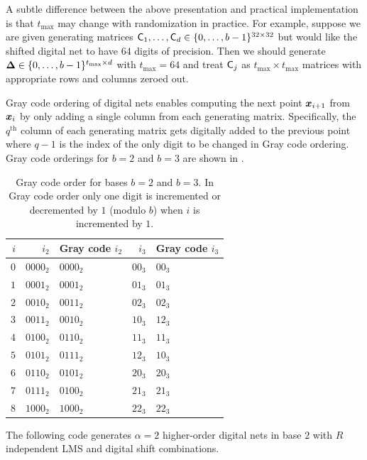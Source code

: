 \documentclass[acmsmall]{acmart}
\begin{document}
A subtle difference between the above presentation and practical implementation is that $t_\mathrm{max}$ may change with randomization in practice. For example, suppose we are given generating matrices ${\mathsf{C}}_1,\dots,{\mathsf{C}}_d \in \{0,\dots,b-1\}^{32 \times32}$ but would like the shifted digital net to have $64$ digits of precision. Then we should generate ${\boldsymbol{\Delta}} \in \{0,\dots,b-1\}^{t_\mathrm{max} \times d}$ with $t_\mathrm{max}=64$ and treat ${\mathsf{C}}_j$ as $t_\mathrm{max} \times t_\mathrm{max}$ matrices with appropriate rows and columns zeroed out. 

Gray code ordering of digital nets enables computing the next point ${\boldsymbol{x}}_{i+1}$ from ${\boldsymbol{x}}_i$ by only adding a single column from each generating matrix. Specifically, the $q^\mathrm{th}$ column of each generating matrix gets digitally added to the previous point where $q-1$ is the index of the only digit to be changed in Gray code ordering. Gray code orderings for $b=2$ and $b=3$ are shown in . 

\begin{table}[H]
    \centering
    \begin{tabular}{r | r l | r l }
        $i$ & $i_2$ & Gray code  $i_2$ & $i_3$ & Gray code $i_3$ \\
        \hline 
        $0$ & $0000_2$ & $0000_2$ & $00_3$ & $00_3$ \\
        $1$ & $0001_2$ & $0001_2$ & $01_3$ & $01_3$ \\ 
        $2$ & $0010_2$ & $0011_2$ & $02_3$ & $02_3$ \\ 
        $3$ & $0011_2$ & $0010_2$ & $10_3$ & $12_3$ \\ 
        $4$ & $0100_2$ & $0110_2$ & $11_3$ & $11_3$ \\ 
        $5$ & $0101_2$ & $0111_2$ & $12_3$ & $10_3$ \\ 
        $6$ & $0110_2$ & $0101_2$ & $20_3$ & $20_3$ \\ 
        $7$ & $0111_2$ & $0100_2$ & $21_3$ & $21_3$ \\ 
        $8$ & $1000_2$ & $1000_2$ & $22_3$ & $22_3$
    \end{tabular}
    \caption{Gray code order for bases $b=2$ and $b=3$. In Gray code order only one digit is incremented or decremented by $1$ (modulo $b$) when $i$ is incremented by $1$.}
    \label{tab:Gray code} 
\end{table}

The following code generates $\alpha=2$ higher-order digital nets in base $2$ with  $R$ independent LMS and digital shift combinations. 
\end{document}
